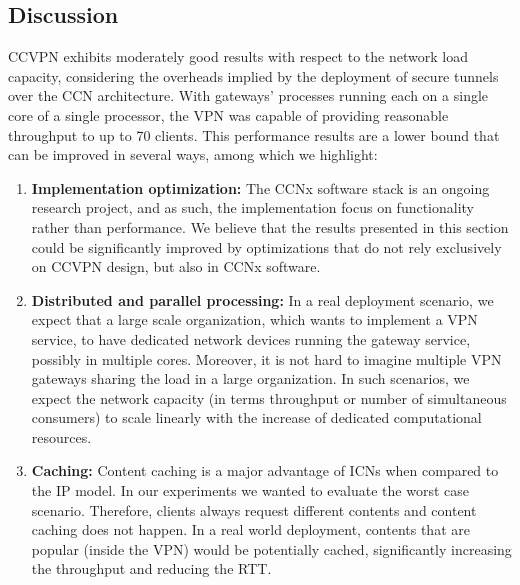 \subsection{Discussion}

CCVPN  exhibits moderately good results with respect to the network load capacity, considering the overheads implied by the deployment of secure tunnels over the CCN architecture.
With gateways' processes running each on a single core of a single processor, the VPN was capable of providing reasonable throughput to up to 70 clients.
This performance results are a lower bound that can be improved in several ways, among which we highlight:

\begin{enumerate}
 \item \textbf{Implementation optimization:} The CCNx software stack is an ongoing research project, and as such, the implementation focus on functionality rather than performance.
 We believe that the results presented in this section could be significantly improved by optimizations that do not rely exclusively on CCVPN design, but also in CCNx software.
 \item \textbf{Distributed and parallel processing:} In a real deployment scenario, we expect that a large scale organization, which wants to implement a VPN service, to have dedicated network devices running
 the gateway service, possibly in multiple cores. Moreover, it is not hard to imagine multiple VPN gateways sharing the load in a large organization.
 In such scenarios, we expect the network capacity (in terms throughput or number of simultaneous consumers) to scale linearly with the increase of dedicated computational resources.
 \item \textbf{Caching:} Content caching is a major advantage of ICNs when compared to the IP model. In our experiments we wanted to evaluate the worst case scenario. Therefore, clients always request different contents
 and content caching does not happen. In a real world deployment, contents that are popular (inside the VPN) would be potentially cached, significantly increasing the throughput and reducing the RTT.

\end{enumerate}
